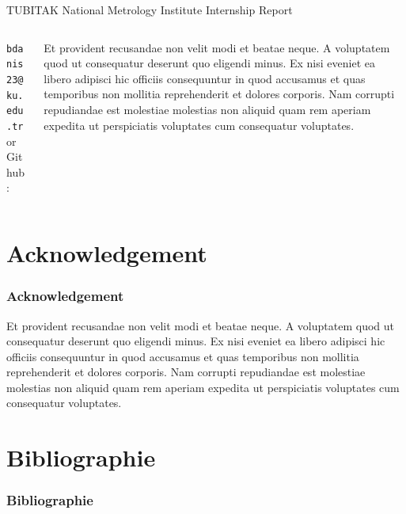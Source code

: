 \documentclass[10t]{beamer}
\begin{document}
\begin{frame}{TUBITAK National Metrology Institute Internship Report}
\begin{columns}
\begin{column}{0.4\textwidth}
\begin{center}
    \texttt{bdanis23@ku.edu.tr} or\\
    Github: \href{https://github.com/bahremsd}{\faGithub}
\end{center}
\end{column}
\begin{column}{0.6\textwidth}

Et provident recusandae non velit modi et beatae neque. A voluptatem quod ut consequatur deserunt quo eligendi minus. Ex nisi eveniet ea libero adipisci hic officiis consequuntur in quod accusamus et quas temporibus non mollitia reprehenderit et dolores corporis. Nam corrupti repudiandae est molestiae molestias non aliquid quam rem aperiam expedita ut perspiciatis voluptates cum consequatur voluptates.

\end{column}
\end{columns} 
\end{frame}

\section*{Acknowledgement}  
\begin{frame}
\frametitle{Acknowledgement}
Et provident recusandae non velit modi et beatae neque. A voluptatem quod ut consequatur deserunt quo eligendi minus. Ex nisi eveniet ea libero adipisci hic officiis consequuntur in quod accusamus et quas temporibus non mollitia reprehenderit et dolores corporis. Nam corrupti repudiandae est molestiae molestias non aliquid quam rem aperiam expedita ut perspiciatis voluptates cum consequatur voluptates.
\end{frame}

\section*{Bibliographie}
\begin{frame}[t,allowframebreaks]
\frametitle{Bibliographie}
\printbibliography
\end{frame}
\end{document}
